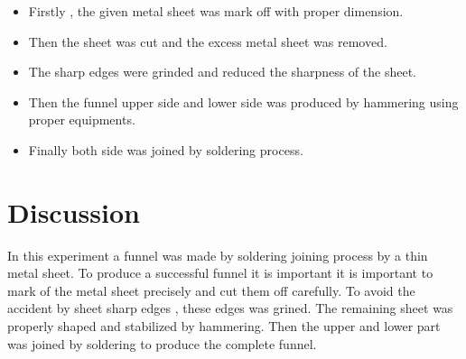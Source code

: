 \documentclass[a4,12pt]{article}
\begin{document}
\begin{itemize}
	\item Firstly , the given metal sheet was mark off with proper dimension.
	\item Then the sheet was cut and the excess metal sheet was removed.
	\item The sharp edges were grinded and reduced the sharpness of the sheet.
	\item Then the funnel upper side and lower side was produced by hammering using proper equipments.
	\item Finally both side was joined by soldering process. 
\end{itemize}

\section*{Discussion}


In this experiment a funnel was made by soldering joining process by a thin metal sheet. To produce a successful funnel it is important it is important to mark of the metal sheet precisely and cut them off carefully. To avoid the accident by sheet sharp edges , these edges was grined. The remaining sheet was properly shaped and stabilized by hammering. Then the upper and lower part was joined by soldering to produce the complete funnel.




	
	
	
	
	
	
	
	
	
	
	
	
	
\end{document}

